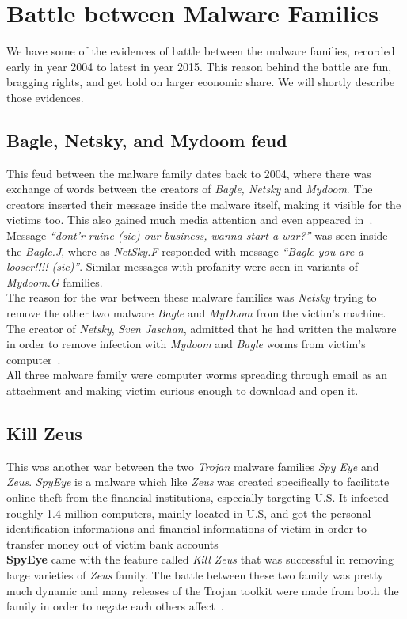 \section{Battle between Malware Families}
\label{sec:Battle between Malware Families}
We have some of the evidences of battle between the malware families, recorded early in year 2004 to latest in year 2015.
This reason behind the battle are fun, bragging rights, and get hold on larger economic share.
We will shortly describe those evidences.
\subsection{Bagle, Netsky, and Mydoom feud}
\label{sub:Bagle, Netsky, and Mydoom feud}
This feud between the malware family dates back to 2004, where there was exchange of words between the creators of \emph{Bagle, Netsky} and \emph{Mydoom}.
The creators inserted their message inside the malware itself, making it visible for the victims too. This also gained much media attention and even appeared in~\cite[BBC]{bbccover}.
Message \emph{``dont'r ruine (sic) our business, wanna start a war?''} was seen inside the \emph{Bagle.J}, where as \emph{NetSky.F} responded with message \emph{``Bagle \- you are a looser!!!! (sic)''}.
Similar messages with profanity were seen in variants of \emph{Mydoom.G} families.\\
The reason for the war between these malware families was \emph{Netsky} trying to remove the other two malware \emph{Bagle} and \emph{MyDoom} from the victim's machine.
The creator of \emph{Netsky}, \emph{Sven Jaschan}, admitted that he had written the malware in order to remove infection with \emph{Mydoom} and \emph{Bagle} worms from victim's computer~\cite[]{wikinetsky}.\\
All three malware family were computer worms spreading through email as an attachment and making victim curious enough to download and open it.
\subsection{Kill Zeus}
\label{sub:Kill Zeus}
This was another war between the two \emph{Trojan} malware families \emph{Spy Eye} and \emph{Zeus}.
\emph{SpyEye} is a malware which like \emph{Zeus} was created specifically to facilitate online theft from the financial institutions, especially targeting U.S.
It infected roughly 1.4 million computers, mainly located in U.S, and got the personal identification informations and financial informations of victim in order to transfer money out of victim bank accounts~\cite[]{fbispyeye} \\
\textbf{SpyEye} came with the feature called \emph{Kill Zeus} that was successful in removing large varieties of \emph{Zeus} family.
The battle between these two family was pretty much dynamic and many releases of the Trojan toolkit were made from both the family in order to negate each others affect~\cite[]{sanszeus}.
